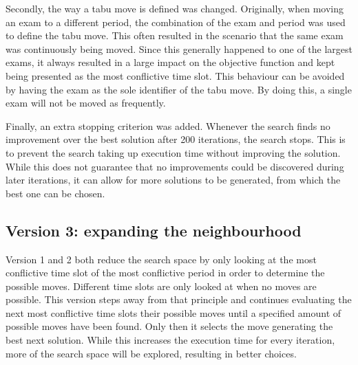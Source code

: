 Secondly, the way a tabu move is defined was changed. Originally, when moving an exam to a different period, the combination of the exam and period was used to define the tabu move. This often resulted in the scenario that the same exam was continuously being moved. Since this generally happened to one of the largest exams, it always resulted in a large impact on the objective function and kept being presented as the most conflictive time slot. This behaviour can be avoided by having the exam as the sole identifier of the tabu move. By doing this, a single exam will not be moved as frequently.

Finally, an extra stopping criterion was added. Whenever the search finds no improvement over the best solution after 200 iterations, the search stops. This is to prevent the search taking up execution time without improving the solution. While this does not guarantee that no improvements could be discovered during later iterations, it can allow for more solutions to be generated, from which the best one can be chosen.
\subsection{Version 3: expanding the neighbourhood} \label{version3}

Version 1 and 2 both reduce the search space by only looking at the most conflictive time slot of the most conflictive period in order to determine the possible moves. Different time slots are only looked at when no moves are possible. This version steps away from that principle and continues evaluating the next most conflictive time slots their possible moves until a specified amount of possible moves have been found. Only then it selects the move generating the best next solution. While this increases the execution time for every iteration, more of the search space will be explored, resulting in better choices.



